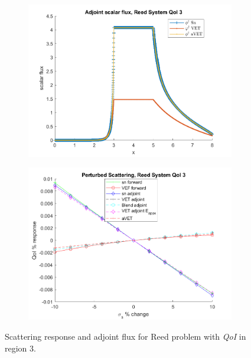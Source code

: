 \documentclass[12pt]{report}
\newcommand{\qoi}{{\it QoI}\xspace}
\begin{document}
\begin{figure}[H]
\centering
\begin{subfigure}{.5\textwidth}
  \centering
  \includegraphics[width=.98\linewidth]{figures2/772phia.png}
\end{subfigure}%
\begin{subfigure}{.5\textwidth}
  \centering
  \includegraphics[width=.98\linewidth]{figures2/772sigsSens.png}
\end{subfigure}
\caption{Scattering response and adjoint flux for Reed problem with \qoi in region 3.}
\label{Reed3}
\end{figure}
\end{document}
